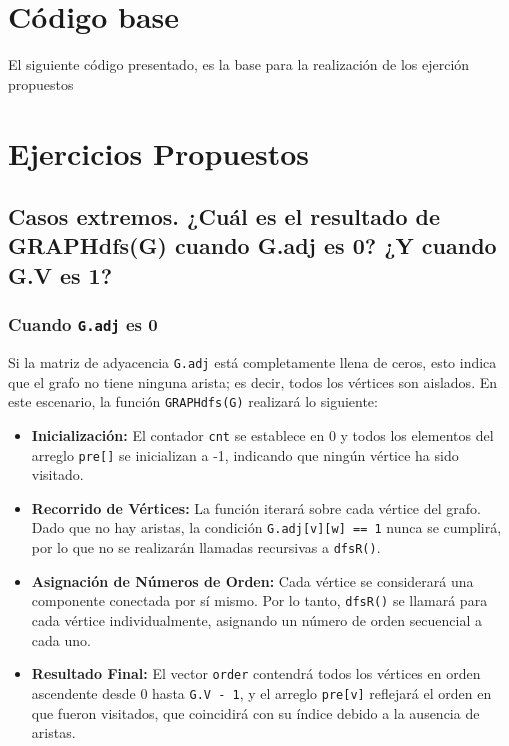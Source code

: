 \documentclass{article}
\begin{document}
\section{Código base}
    El siguiente código presentado, es la base para la realización de los ejerción propuestos\\
    

\section{Ejercicios Propuestos}
    \subsection{Casos extremos. ¿Cuál es el resultado de GRAPHdfs(G) cuando G.adj es 0? ¿Y cuando G.V es 1?
    }

       \subsubsection*{Cuando \texttt{G.adj} es 0}
            Si la matriz de adyacencia \texttt{G.adj} está completamente llena de ceros, esto indica que el grafo no tiene ninguna arista; es decir, todos los vértices son aislados. En este escenario, la función \texttt{GRAPHdfs(G)} realizará lo siguiente:
            
            \begin{itemize}
                \item \textbf{Inicialización:} El contador \texttt{cnt} se establece en 0 y todos los elementos del arreglo \texttt{pre[]} se inicializan a -1, indicando que ningún vértice ha sido visitado.
                
                \item \textbf{Recorrido de Vértices:} La función iterará sobre cada vértice del grafo. Dado que no hay aristas, la condición \texttt{G.adj[v][w] == 1} nunca se cumplirá, por lo que no se realizarán llamadas recursivas a \texttt{dfsR()}.
                
                \item \textbf{Asignación de Números de Orden:} Cada vértice se considerará una componente conectada por sí mismo. Por lo tanto, \texttt{dfsR()} se llamará para cada vértice individualmente, asignando un número de orden secuencial a cada uno.
                
                \item \textbf{Resultado Final:} El vector \texttt{order} contendrá todos los vértices en orden ascendente desde 0 hasta \texttt{G.V - 1}, y el arreglo \texttt{pre[v]} reflejará el orden en que fueron visitados, que coincidirá con su índice debido a la ausencia de aristas.
            \end{itemize}
    
\end{document}
